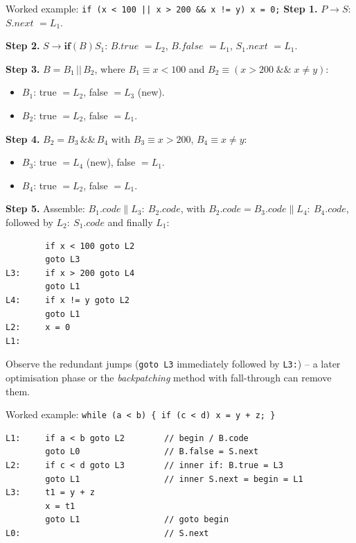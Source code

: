 \documentclass[11pt,a4paper]{article}
\newcommand{\cc}{\mathbin{\|}}
\newcommand{\at}[2]{\ensuremath{#1.\mathit{#2}}}
\begin{document}
\begin{examplebox}{Worked example: \texttt{if (x < 100 || x > 200 \&\& x != y) x = 0;}}
\textbf{Step 1.} $P \to S$: \at{S}{next} $= L_1$.

\textbf{Step 2.} $S \to \mathbf{if}(B)S_1$: \at{B}{true} $= L_2$, \at{B}{false} $= L_1$, \at{S_1}{next} $= L_1$.

\textbf{Step 3.} $B = B_1 \,||\, B_2$, where $B_1 \equiv x<100$ and $B_2 \equiv (x>200 \;\&\&\; x\ne y)$:
\begin{itemize}[nosep]
\item $B_1$: true $= L_2$, false $= L_3$ (new).
\item $B_2$: true $= L_2$, false $= L_1$.
\end{itemize}
\textbf{Step 4.} $B_2 = B_3 \,\&\&\, B_4$ with $B_3 \equiv x>200$, $B_4 \equiv x \ne y$:
\begin{itemize}[nosep]
\item $B_3$: true $= L_4$ (new), false $= L_1$.
\item $B_4$: true $= L_2$, false $= L_1$.
\end{itemize}
\textbf{Step 5.} Assemble: $B_1.code \cc L_3{:}\ B_2.code$, with $B_2.code = B_3.code \cc L_4{:}\ B_4.code$, followed by $L_2{:}\ S_1.code$ and finally $L_1{:}$

\begin{lstlisting}
        if x < 100 goto L2
        goto L3
L3:     if x > 200 goto L4
        goto L1
L4:     if x != y goto L2
        goto L1
L2:     x = 0
L1:
\end{lstlisting}
Observe the redundant jumps (\texttt{goto L3} immediately followed by \texttt{L3:}) -- a later optimisation phase or the \emph{backpatching} method with fall-through can remove them.
\end{examplebox}

\begin{examplebox}{Worked example: \texttt{while (a < b) \{ if (c < d) x = y + z; \}}}
\begin{lstlisting}
L1:     if a < b goto L2        // begin / B.code
        goto L0                 // B.false = S.next
L2:     if c < d goto L3        // inner if: B.true = L3
        goto L1                 // inner S.next = begin = L1
L3:     t1 = y + z
        x = t1
        goto L1                 // goto begin
L0:                             // S.next
\end{lstlisting}
\end{examplebox}
\end{document}
